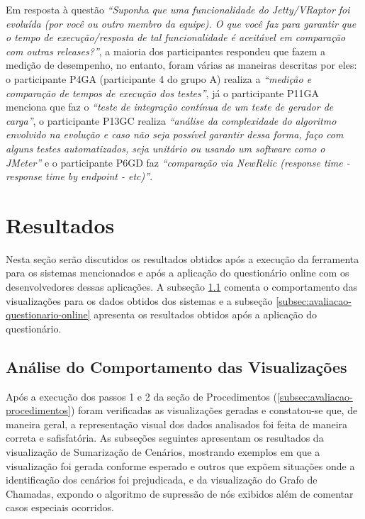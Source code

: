 Em resposta à questão \textit{``Suponha que uma funcionalidade do Jetty/VRaptor foi evoluída (por você ou outro membro da equipe). O que você faz para garantir que o tempo de execução/resposta de tal funcionalidade é aceitável em comparação com outras releases?''}, a maioria dos participantes respondeu que fazem a medição de desempenho, no entanto, foram várias as maneiras descritas por eles: o participante P4GA (participante 4 do grupo A) realiza a \textit{``medição e comparação de tempos de execução dos testes''}, já o participante P11GA menciona que faz o \textit{``teste de integração contínua de um teste de gerador de carga''}, o participante P13GC realiza \textit{``análise da complexidade do algoritmo envolvido na evolução e caso não seja possível garantir dessa forma, faço com alguns testes automatizados, seja unitário ou usando um software como o JMeter''} e o participante P6GD faz \textit{``comparação via NewRelic (response time - response time by endpoint - etc)''}.

\section{Resultados} \label{sec:avaliacao-resultados}

Nesta seção serão discutidos os resultados obtidos após a execução da ferramenta para os sistemas mencionados e após a aplicação do questionário online com os desenvolvedores dessas aplicações. A subseção \ref{subsec:avaliacao-comportamento-visualizacoes} comenta o comportamento das visualizações para os dados obtidos dos sistemas e a subseção \ref{subsec:avaliacao-questionario-online} apresenta os resultados obtidos após a aplicação do questionário.

\subsection{Análise do Comportamento das Visualizações} \label{subsec:avaliacao-comportamento-visualizacoes}

Após a execução dos passos 1 e 2 da seção de Procedimentos (\ref{subsec:avaliacao-procedimentos}) foram verificadas as visualizações geradas e constatou-se que, de maneira geral, a representação visual dos dados analisados foi feita de maneira correta e safisfatória. As subseções seguintes apresentam os resultados da visualização de Sumarização de Cenários, mostrando exemplos em que a visualização foi gerada conforme esperado e outros que expõem situações onde a identificação dos cenários foi prejudicada, e da visualização do Grafo de Chamadas, expondo o algoritmo de supressão de nós exibidos além de comentar casos especiais ocorridos.

